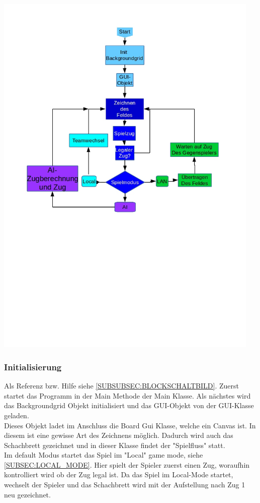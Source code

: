 \documentclass[12pt,a4paper]{article}
\newcommand{\cmnt}[1]{}			%
\begin{document}
{\includegraphics[height=18cm]{graphics/block.jpg}
\cmnt{Blockschaltbild verändern, da init Backgroundgrid und GUI-Objekt vertauscht sind.}

\subsubsection{Initialisierung}
\label{SUBSUBSEC:INIT}

\cmnt{Hier soll erklärt werden wie JavaChess initialisiert wird.}

Als Referenz bzw. Hilfe siehe \ref{SUBSUBSEC:BLOCKSCHALTBILD}.
Zuerst startet das Programm in der Main Methode der Main Klasse. Als nächstes wird das Backgroundgrid Objekt initialisiert und das GUI-Objekt von der GUI-Klasse geladen. \\
Dieses Objekt ladet im Anschluss die Board Gui Klasse, welche ein Canvas ist. In diesem ist eine gewisse Art des Zeichnens möglich. Dadurch wird auch das Schachbrett gezeichnet und in dieser Klasse findet der "Spielfluss" statt. \\ 
Im default Modus startet das Spiel im "Local" game mode, siehe \ref{SUBSEC:LOCAL_MODE}. Hier spielt der Spieler zuerst einen Zug, woraufhin kontrolliert wird ob der Zug legal ist. Da das Spiel im Local-Mode startet, wechselt der Spieler und das Schachbrett wird mit der Aufstellung nach Zug 1 neu gezeichnet.

}
\end{document}
